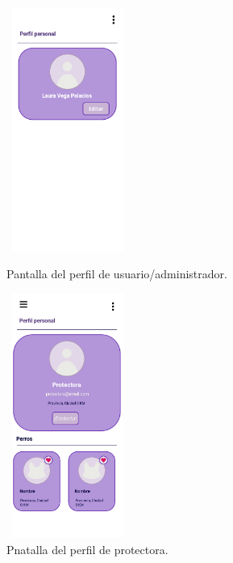 \documentclass[a4paper, 12pt]{article}
\begin{document}
\begin{figure}[H]
   	\begin{minipage}{0.48\textwidth}
		\begin{center}
			{\includegraphics[height=8cm, width=4cm]{design/UserProfile.jpg}\par}
			\caption{Pantalla del perfil de usuario/administrador.}
			\medskip

		\end{center}  
	\end{minipage}\hfill
   	\begin{minipage}{0.48\textwidth}
		\begin{center}
			{\includegraphics[height=8cm, width=4cm]{design/CompanyProfile.jpg}\par}
			\caption{Pnatalla del perfil de protectora. }
			\medskip
		\end{center}  
	\end{minipage}\hfill
\end{figure}
\end{document}
